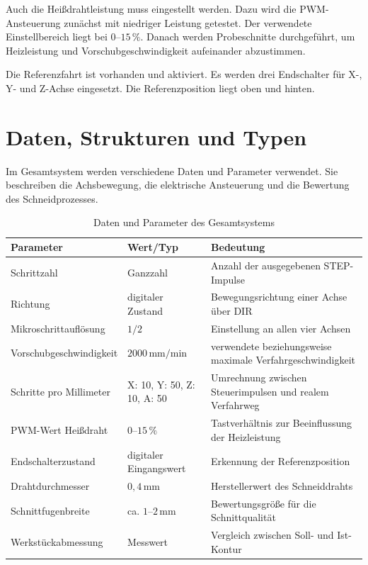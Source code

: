 Auch die Heißdrahtleistung muss eingestellt werden. Dazu wird die PWM-Ansteuerung zunächst mit niedriger Leistung getestet. Der verwendete Einstellbereich liegt bei \(0\)--\(15\,\%\). Danach werden Probeschnitte durchgeführt, um Heizleistung und Vorschubgeschwindigkeit aufeinander abzustimmen.

Die Referenzfahrt ist vorhanden und aktiviert. Es werden drei Endschalter für X-, Y- und Z-Achse eingesetzt. Die Referenzposition liegt oben und hinten.

\section{Daten, Strukturen und Typen}
\label{sec:komplettes_system_daten}

Im Gesamtsystem werden verschiedene Daten und Parameter verwendet. Sie beschreiben die Achsbewegung, die elektrische Ansteuerung und die Bewertung des Schneidprozesses.

\begin{table}[H]
	\centering
	\caption{Daten und Parameter des Gesamtsystems}
	\label{tab:daten_parameter_gesamtsystem}
	\begin{tabular}{p{4cm} p{4cm} p{6cm}}
		\hline
		\textbf{Parameter} & \textbf{Wert/Typ} & \textbf{Bedeutung} \\
		\hline
		Schrittzahl & Ganzzahl & Anzahl der ausgegebenen STEP-Impulse \\
		Richtung & digitaler Zustand & Bewegungsrichtung einer Achse über DIR \\
		Mikroschrittauflösung & \(1/2\) & Einstellung an allen vier Achsen \\
		Vorschubgeschwindigkeit & \(2000\,\mathrm{mm/min}\) & verwendete beziehungsweise maximale Verfahrgeschwindigkeit \\
		Schritte pro Millimeter & X: 10, Y: 50, Z: 10, A: 50 & Umrechnung zwischen Steuerimpulsen und realem Verfahrweg \\
		PWM-Wert Heißdraht & \(0\)--\(15\,\%\) & Tastverhältnis zur Beeinflussung der Heizleistung \\
		Endschalterzustand & digitaler Eingangswert & Erkennung der Referenzposition \\
		Drahtdurchmesser & \(0{,}4\,\mathrm{mm}\) & Herstellerwert des Schneiddrahts \\
		Schnittfugenbreite & ca. \(1\)--\(2\,\mathrm{mm}\) & Bewertungsgröße für die Schnittqualität \\
		Werkstückabmessung & Messwert & Vergleich zwischen Soll- und Ist-Kontur \\
		\hline
	\end{tabular}
\end{table}



